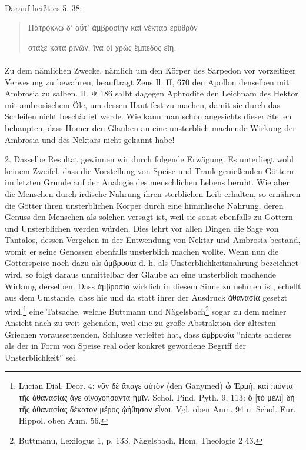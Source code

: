 \documentclass[a4paper, 11pt, oneside]{article}
\begin{document}
\paragraph{}
Darauf heißt es 5. 38:
\begin{quotation}
Πατρόκλῳ δ' αὖτ' ἀμβροσίην καὶ νέκταρ ἐρυθρόν

στάξε κατὰ ῥινῶν, ἵνα οἱ χρὼς ἔμπεδος εἴη.
\end{quotation}
\paragraph{}
Zu dem nämlichen Zwecke, nämlich um den Körper des Sarpedon vor vorzeitiger Verwesung zu bewahren, beauftragt Zeus Il. Π, 670 den Apollon denselben mit Ambrosia zu salben. Il. Ψ 186 salbt dagegen Aphrodite den Leichnam des Hektor mit ambrosischem Öle, um dessen Haut fest zu machen, damit sie durch das Schleifen nicht beschädigt werde. Wie kann man schon angesichts dieser Stellen behaupten, dass Homer den Glauben an eine unsterblich machende Wirkung der Ambrosia und des Nektars nicht gekannt habe!

2. Dasselbe Resultat gewinnen wir durch folgende Erwägung. Es unterliegt wohl keinem Zweifel, dass die Vorstellung von Speise und Trank genießenden Göttern im letzten Grunde auf der Analogie des menschlichen Lebens beruht. Wie aber die Menschen durch irdische Nahrung ihren sterblichen Leib erhalten, so ernähren die Götter ihren unsterblichen Körper durch eine himmlische Nahrung, deren Genuss den Menschen als solchen versagt ist, weil sie sonst ebenfalls zu Göttern und Unsterblichen werden würden. Dies lehrt vor allen Dingen die Sage von Tantalos, dessen Vergehen in der Entwendung von Nektar und Ambrosia bestand, womit er seine Genossen ebenfalls unsterblich machen wollte. Wenn nun die Götterspeise noch dazu als ἀμβροσία d. h. als Unsterblichkeitsnahrung bezeichnet wird, so folgt daraus unmittelbar der Glaube an eine unsterblich machende Wirkung derselben. Dass ἀμβροσία wirklich in diesem Sinne zu nehmen ist, erhellt aus dem Umstande, dass hie und da statt ihrer der Ausdruck ἀθανασία gesetzt wird,\footnote{Lucian Dial. Deor. 4: νῦν δὲ ἄπαγε αὐτὸν (den Ganymed) ὦ Ἑρμῆ, καὶ πιόντα τῆς ἀθανασίας ἄγε οἰνοχοήσαντα ἡμῖν. Schol. Pind. Pyth. 9, 113: ὃ [τὸ μέλι] δὴ τῆς ἀθανασίας δέκατον μέρος ᾠήθησαν εἶναι. Vgl. oben Anm. 94 u. Schol. Eur. Hippol. oben Aum. 56.} eine Tatsache, welche Buttmann und Nägelsbach\footnote{Buttmanu, Lexilogus 1, p. 133. Nägelsbach, Hom. Theologie 2 43.} sogar zu dem meiner Ansicht nach zu weit gehenden, weil eine zu große Abstraktion der ältesten Griechen voraussetzenden, Schlusse verleitet hat, dass ἀμβροσία "`nichts anderes als der in Form von Speise real oder konkret gewordene Begriff der Unsterblichkeit"' sei.
\end{document}
